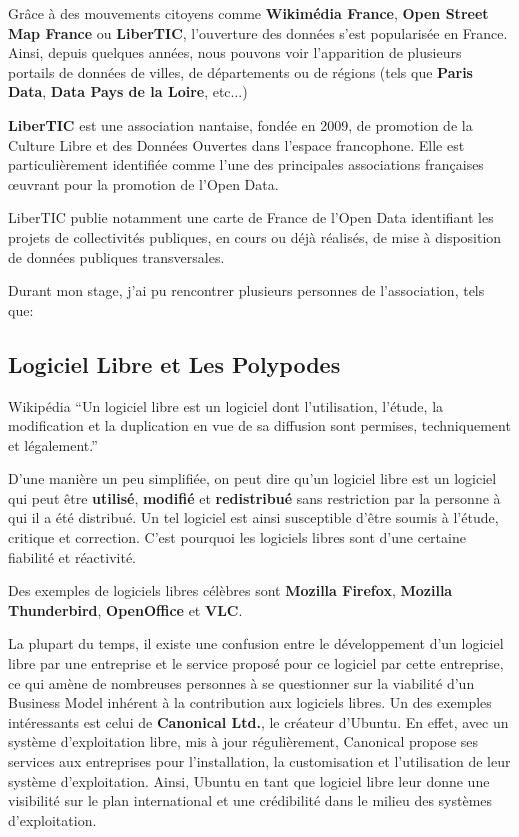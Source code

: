 Grâce à des mouvements citoyens comme \textbf{Wikimédia France}, \textbf{Open Street Map France} ou \textbf{LiberTIC}, l'ouverture des données s'est popularisée en France. Ainsi, depuis quelques années, nous pouvons voir l'apparition de plusieurs portails de données de villes, de départements ou de régions (tels que \textbf{Paris Data}, \textbf{Data Pays de la Loire}, etc...)

\textbf{LiberTIC} est une association nantaise, fondée en 2009, de promotion de la Culture Libre et des Données Ouvertes dans l'espace francophone. Elle est particulièrement identifiée comme l'une des principales associations françaises œuvrant pour la promotion de l'Open Data.

LiberTIC publie notamment une carte de France de l'Open Data identifiant les projets de collectivités publiques, en cours ou déjà réalisés, de mise à disposition de données publiques transversales.

\vspace{1cm}

Durant mon stage, j'ai pu rencontrer plusieurs personnes de l'association, tels que:


\subsection{Logiciel Libre et Les Polypodes}

\begin{aquote}{Wikipédia}
``Un logiciel libre est un logiciel dont l'utilisation, l'étude, la modification et la duplication en vue de sa diffusion sont permises, techniquement et légalement.''
\end{aquote}

D'une manière un peu simplifiée, on peut dire qu'un logiciel libre est un logiciel qui peut être \textbf{utilisé}, \textbf{modifié} et \textbf{redistribué} sans restriction par la personne à qui il a été distribué. Un tel logiciel est ainsi susceptible d'être soumis à l'étude, critique et correction. C'est pourquoi les logiciels libres sont d'une certaine fiabilité et réactivité.

Des exemples de logiciels libres célèbres sont \textbf{Mozilla Firefox}, \textbf{Mozilla Thunderbird}, \textbf{OpenOffice} et \textbf{VLC}.

\vspace{1cm}

La plupart du temps, il existe une confusion entre le développement d'un logiciel libre par une entreprise et le service proposé pour ce logiciel par cette entreprise, ce qui amène de nombreuses personnes à se questionner sur la viabilité d'un Business Model inhérent à la contribution aux logiciels libres. Un des exemples intéressants est celui de \textbf{Canonical Ltd.}, le créateur d'Ubuntu. En effet, avec un système d'exploitation libre, mis à jour régulièrement, Canonical propose ses services aux entreprises pour l'installation, la customisation et l'utilisation de leur système d'exploitation. Ainsi, Ubuntu en tant que logiciel libre leur donne une visibilité sur le plan international et une crédibilité dans le milieu des systèmes d'exploitation.


